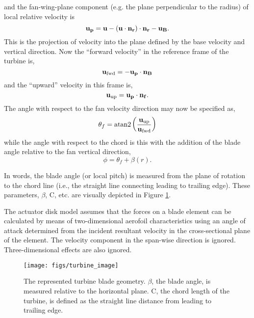 and the fan-wing-plane component (e.g. the plane perpendicular to the 
radius) of local relative velocity is
\begin{equation}
{\bf u_p} = {\bf u} - ({\bf u}\cdot {\bf n_r})\cdot {\bf n_r} - {\bf u_B}. 
\end{equation}
This is the projection of velocity into the plane defined by the base
velocity and vertical direction. Now the ``forward velocity'' in the
reference frame of the turbine is,  
\begin{equation}
{\bf u_{\text{fwd}}}= -{\bf u_p} \cdot {\bf n_B}
\end{equation}
and the ``upward'' velocity in this frame is, 
\begin{equation}
{\bf u_{\text{up}}} = {\bf u_p} \cdot {\bf n_f}. 
\end{equation}
The angle with respect to the fan velocity direction may now be
specified as, 
\begin{equation}
 \theta_f = \text{atan2}\left(\frac{{\bf u_{\text{up}}}}{{\bf u_{\text{fwd}}}}\right)
  \label{eq:fan_direction}
\end{equation}
while the angle with respect to the chord is this with the addition of
the blade angle relative to the fan vertical direction, 
\begin{equation}
 \phi = \theta_f + \beta(r).
\end{equation}

In words, the blade angle (or local pitch) is measured from the plane of
rotation to the chord line (i.e., the straight line connecting leading
to trailing edge). These parameters, $\beta$, C, etc. are visually
depicted in Figure \ref{fig:turbine_image}.  

The actuator disk model assumes that the forces on a blade
element can be calculated by means of two-dimensional aerofoil
characteristics using an angle of attack determined from the incident
resultant velocity in the cross-sectional plane of the element. The
velocity component in the span-wise direction is
ignored. Three-dimensional effects are also
ignored\cite{burton2001wind}.  

  \begin{figure}[!htb]
    \begin{center}
     \texttt{[image: figs/turbine\_image]}
     \caption{The represented turbine blade
     geometry. $\beta$, the blade angle, is measured relative to the
     horizontal plane. C, the chord length of the turbine, is defined as
     the straight line distance from leading to trailing edge. } 
     \label{fig:turbine_image}
    \end{center}
  \end{figure}

